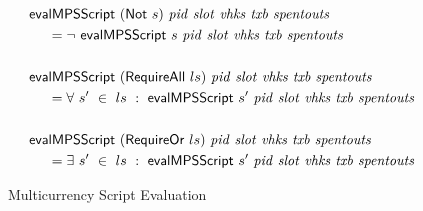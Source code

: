 \begin{figure*}[htb]
\begin{align*}
    &\mathsf{evalMPSScript}~(\mathsf{Not}~s)~\mathit{pid}~\mathit{slot}~\mathit{vhks}
    ~\mathit{txb}~\mathit{spentouts}
   \\
    &~~~~ = \neg ~\mathsf{evalMPSScript}~s~\mathit{pid}~\mathit{slot}~\mathit{vhks}
    ~\mathit{txb}~\mathit{spentouts}\\~\\
    &\mathsf{evalMPSScript}~(\mathsf{RequireAll}~ls)~\mathit{pid}~\mathit{slot}~\mathit{vhks}
    ~\mathit{txb}~\mathit{spentouts}
   \\
    &~~~~ = \forall ~s'~ \in~ ls~:~\mathsf{evalMPSScript}~s'~\mathit{pid}~\mathit{slot}~\mathit{vhks}
    ~\mathit{txb}~\mathit{spentouts}\\~\\
    &\mathsf{evalMPSScript}~(\mathsf{RequireOr}~ls)~\mathit{pid}~\mathit{slot}~\mathit{vhks}
    ~\mathit{txb}~\mathit{spentouts}
   \\
    &~~~~ = \exists ~s'~ \in~ ls~:~\mathsf{evalMPSScript}~s'~\mathit{pid}~\mathit{slot}~\mathit{vhks}
    ~\mathit{txb}~\mathit{spentouts}\\
  \end{align*}
  \caption{Multicurrency Script Evaluation}
  \label{fig:defs:tx-mc-eval}
\end{figure*}

